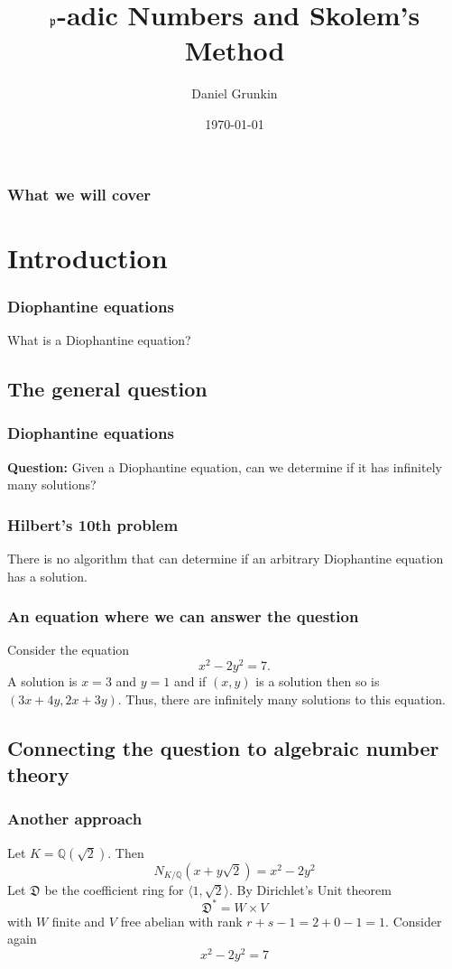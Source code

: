 \documentclass{beamer}
\title{$\mfrak p$-adic Numbers and Skolem's Method}
\institute{University of Copenhagen}
\author{Daniel Grunkin}
\date{\today}
\newcommand{\mfrak}[1]{\mathfrak{#1}}
\newcommand{\mbb}[1]{\mathbb{#1}}
\numberwithin{equation}{section}
\begin{document}

\frame{\titlepage} %

\begin{frame}
	\frametitle{What we will cover} 
	\tableofcontents
\end{frame}

\section{Introduction}



\begin{frame}
	\frametitle{Diophantine equations}
	What is a Diophantine equation?

\end{frame}

\subsection{The general question}
\begin{frame}
	\frametitle{Diophantine equations}

	\textbf{Question:} Given a Diophantine equation, can we determine if it has infinitely many solutions?
\end{frame}


\begin{frame}
\frametitle{Hilbert's 10th problem}
There is no algorithm that can determine if an arbitrary Diophantine equation has a solution.
\end{frame}

\begin{frame}
	\frametitle{An equation where we can answer the question}
	Consider the equation $$x^2 - 2y^2 = 7.$$
	A solution is $x = 3$ and $y = 1$ and if $(x,y)$ is a solution then so is $(3x + 4y, 2x + 3y)$. Thus, there are infinitely many solutions to this equation.
\end{frame}

\subsection{Connecting the question to algebraic number theory}
\begin{frame}
	\frametitle{Another approach}
    Let $K = \mbb Q(\sqrt 2)$. Then
    $$N_{K / \mbb Q}(x + y\sqrt 2) = x^2 - 2y^2$$
    Let $\mfrak D$ be the coefficient ring for $\langle 1, \sqrt 2 \rangle$. By Dirichlet's Unit theorem
	$$\mfrak D^* = W \times V$$
	with $W$ finite and $V$ free abelian with rank $r + s - 1 = 2 + 0 - 1 = 1$.
	Consider again $$x^2 - 2y^2 = 7$$
\end{frame}
\end{document}
